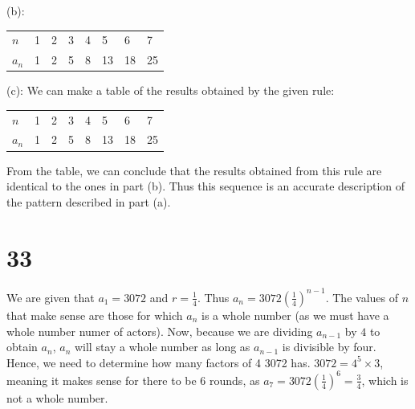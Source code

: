 \documentclass{article}
\theoremstyle{definition}
\newcommand{\?}{\stackrel{?}{=}}
\begin{document}
(b):
\begin{center}
\begin{tabular}{l|l|l|l|l|l|l|l}
$n$ & 1 & 2 & 3 & 4 & 5 & 6 & 7 \\
$a_n$ & 1 & 2 & 5 & 8 & 13 & 18 & 25
\end{tabular}
\end{center}

(c): We can make a table of the results obtained by the given rule:
\begin{center}
\begin{tabular}{l|l|l|l|l|l|l|l}
$n$ & 1 & 2 & 3 & 4 & 5 & 6 & 7 \\
$a_n$ & 1 & 2 & 5 & 8 & 13 & 18 & 25
\end{tabular}
\end{center}
From the table, we can conclude that the results obtained from this rule are identical to the ones in part (b). Thus this sequence is an accurate description of the pattern 
described in part (a).

\section*{33}
We are given that $a_1=3072$ and $r=\frac{1}{4}$. Thus $a_n=3072(\frac{1}{4})^{n-1}$. The values of $n$ that make sense are those for which $a_n$ is a whole number (as we must have a whole number 
numer of actors). Now, because we are dividing
$a_{n-1}$ by $4$ to obtain $a_n$, $a_n$ will stay a whole number as long as $a_{n-1}$ is divisible by four. Hence, we need to determine how many factors of 4 3072 has. 
$3072=4^5\times 3$, meaning it makes sense for there to be 6 rounds, as $a_7=3072(\frac{1}{4})^6=\frac{3}{4}$, which is not a whole number. 
\end{document}
